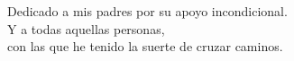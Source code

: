 
\thispagestyle{empty}


\vspace*{3cm}

\begin{flushleft}
Dedicado a mis padres por su apoyo incondicional. \\

\bigskip
Y a todas aquellas personas, \\
con las que he tenido la suerte de cruzar caminos. \\ 
\end{flushleft}

